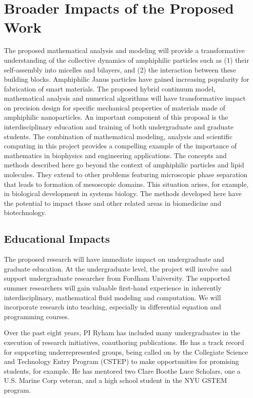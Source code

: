 \section{Broader Impacts of the Proposed Work}
\label{sec:BroaderImpacts}


The proposed mathematical analysis and modeling will provide a transformative
understanding of the collective dynamics of amphiphilic particles such as 
(1) their self-assembly into micelles and bilayers, and 
(2) the interaction between these building blocks.
Amphiphilic Janus particles have gained increasing popularity for fabrication of smart materials.
The proposed hybrid continuum model, mathematical analysis and numerical algorithms will have transformative impact on
precision design for specific mechanical properties of materials made of amphiphilic nanoparticles.
An important component of this proposal is the interdisciplinary education and training of
both undergraduate and graduate students.  The combination of mathematical modeling, analysis and
scientific computing  in this project provides a compelling
example of the importance of mathematics in biophysics and engineering applications.
The concepts and
methods described here go beyond the context of amphiphilic particles and lipid molecules. They extend
to other problems featuring microscopic phase separation that leads to  formation of mesoscopic domains.
This situation arises, for example, in biological development in systems biology.
The methods developed here have the potential to impact those and other related areas in biomedicine and biotechnology.

\subsection{Educational Impacts}
\label{subsec:Educational_plans}
The proposed research will have immediate impact on 
undergraduate and graduate education. At the undergraduate level,
the project will involve and support undergraduate researcher from Fordham University.
The supported summer researchers will gain valuable first-hand 
experience in inherently interdisciplinary, mathematical fluid modeling and computation.
We will incorporate research into teaching, especially in differential equation  
and programming courses. 

Over the past eight years, PI Ryham has included many undergraduates 
in the execution of research initiatives, coauthoring 
publications. He has a  track record for supporting underrepresented groups,
being called on by the Collegiate Science and Technology Entry Program (CSTEP) to make
opportunities for promising students, for example. He has mentored
two Clare Boothe Luce Scholars, one a U.S. Marine Corp veteran,
and a high school student in the NYU GSTEM program. 

